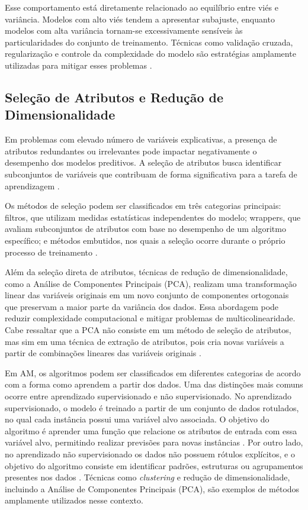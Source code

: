 Esse comportamento está diretamente relacionado ao equilíbrio entre viés e variância. Modelos com alto viés tendem a apresentar subajuste, enquanto 
modelos com alta variância tornam-se excessivamente sensíveis às particularidades do conjunto de treinamento. Técnicas como validação cruzada, regularização 
e controle da complexidade do modelo são estratégias amplamente utilizadas para mitigar esses problemas \cite{Geron2019}.

\subsection{Seleção de Atributos e Redução de Dimensionalidade}

Em problemas com elevado número de variáveis explicativas, a presença de atributos redundantes ou irrelevantes pode impactar negativamente 
o desempenho dos modelos preditivos. A seleção de atributos busca identificar subconjuntos de variáveis que contribuam de forma significativa para 
a tarefa de aprendizagem \cite{Liu2010}.

Os métodos de seleção podem ser classificados em três categorias principais: filtros, que utilizam medidas estatísticas independentes do modelo; 
wrappers, que avaliam subconjuntos de atributos com base no desempenho de um algoritmo específico; e métodos embutidos, nos quais a seleção ocorre 
durante o próprio processo de treinamento \cite{Guyon2006}.

Além da seleção direta de atributos, técnicas de redução de dimensionalidade, como a Análise de Componentes Principais (PCA), 
realizam uma transformação linear das variáveis originais em um novo conjunto de componentes ortogonais que preservam a maior parte da variância dos dados. 
Essa abordagem pode reduzir complexidade computacional e mitigar problemas de multicolinearidade. Cabe ressaltar que a PCA não consiste em um método 
de seleção de atributos, mas sim em uma técnica de extração de atributos, pois cria novas variáveis a partir de combinações lineares das variáveis originais \cite{Guyon2006}.

Em AM, os algoritmos podem ser classificados em diferentes categorias de acordo com a forma como aprendem a partir dos dados. 
Uma das distinções mais comuns ocorre entre aprendizado supervisionado e não supervisionado. 
No aprendizado supervisionado, o modelo é treinado a partir de um conjunto de dados rotulados, no qual cada instância possui uma variável alvo associada. 
O objetivo do algoritmo é aprender uma função que relacione os atributos de entrada com essa variável alvo, permitindo realizar previsões para novas instâncias \cite{Geron2019}. 
Por outro lado, no aprendizado não supervisionado os dados não possuem rótulos explícitos, e o objetivo do algoritmo consiste em identificar padrões, estruturas ou agrupamentos 
presentes nos dados \cite{Geron2019}. Técnicas como \textit{clustering} e redução de dimensionalidade, incluindo a Análise de Componentes Principais (PCA), 
são exemplos de métodos amplamente utilizados nesse contexto.

